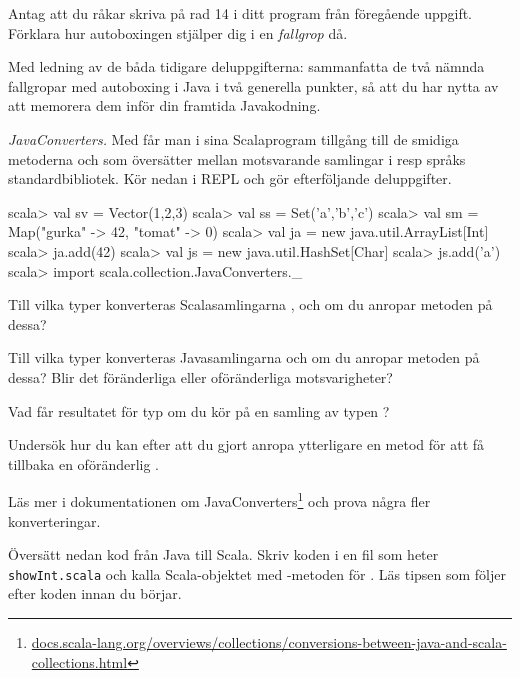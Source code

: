 \Subtask\Pen Antag att du råkar skriva  på rad 14 i ditt program från föregående uppgift. Förklara hur autoboxingen stjälper dig i en \emph{fallgrop} då.

\Subtask\Pen Med ledning av de båda tidigare deluppgifterna: sammanfatta de två nämnda fallgropar med autoboxing i Java i två generella punkter, så att du har nytta av att memorera dem inför din framtida Javakodning.


\Task \emph{JavaConverters.} Med  får man i sina Scalaprogram tillgång till de smidiga metoderna  och  som översätter mellan motsvarande samlingar i resp språks standardbibliotek. Kör nedan i REPL och gör efterföljande deluppgifter.

\begin{REPL}
scala> val sv = Vector(1,2,3)
scala> val ss = Set('a','b','c')
scala> val sm = Map("gurka" -> 42, "tomat" -> 0)
scala> val ja = new java.util.ArrayList[Int]
scala> ja.add(42)
scala> val js = new java.util.HashSet[Char]
scala> js.add('a')
scala> import scala.collection.JavaConverters._
\end{REPL}

\Subtask Till vilka typer konverteras Scalasamlingarna ,  och  om du anropar metoden  på dessa?

\Subtask Till vilka typer konverteras Javasamlingarna  och   om du anropar metoden  på dessa? Blir det föränderliga eller oföränderliga motsvarigheter?

\Subtask Vad får resultatet för typ om du kör  på en samling av typen ?

\Subtask Undersök hur du kan efter att du gjort  anropa ytterligare en metod för att få tillbaka en oföränderlig .

\Subtask Läs mer i dokumentationen om JavaConverters\footnote{\href{http://docs.scala-lang.org/overviews/collections/conversions-between-java-and-scala-collections.html}{docs.scala-lang.org/overviews/collections/conversions-between-java-and-scala-collections.html}}
och prova några fler konverteringar.


\ExtraTasks %

\Task Översätt nedan kod från Java till Scala. Skriv koden i en fil som heter \texttt{showInt.scala} och kalla Scala-objektet med -metoden för . Läs tipsen som följer efter koden innan du börjar.

